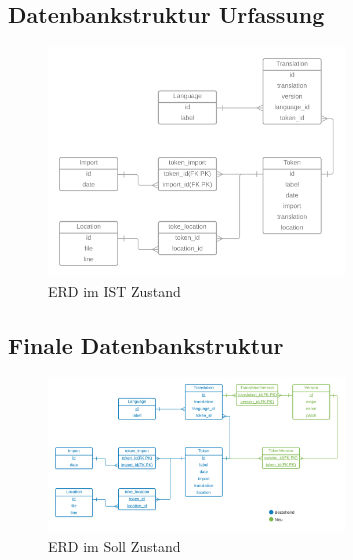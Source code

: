 \documentclass[10pt, oneside, ngerman]{article}
\begin{document}
\subsection{Datenbankstruktur Urfassung}\label{sec:erd:is}
  \begin{figure}[htb]
    \centering
    \includegraphics[width=0.7\textwidth]{ERD_TranslationService_IST-Analyse.png}
    \caption{ERD im IST Zustand}
  \end{figure}
\subsection{Finale Datenbankstruktur}\label{sec:erd:final}
  \begin{figure}[ht]
    \label{abb:erd:final}
    \centering
    \includegraphics[width=0.7\textwidth]{ERD_TranslationService_Soll-Analyse.png}
    \caption{ERD im Soll Zustand}
  \end{figure}
  \newpage
\end{document}
